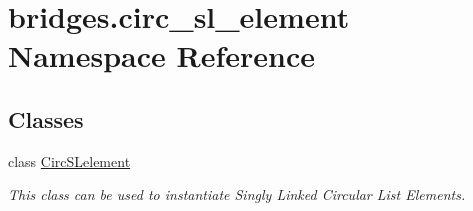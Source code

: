 \hypertarget{namespacebridges_1_1circ__sl__element}{}\section{bridges.\+circ\+\_\+sl\+\_\+element Namespace Reference}
\label{namespacebridges_1_1circ__sl__element}
\subsection*{Classes}
\begin{DoxyCompactItemize}
\item 
class \hyperlink{classbridges_1_1circ__sl__element_1_1_circ_s_lelement}{Circ\+S\+Lelement}
\begin{DoxyCompactList}\small\item\em This class can be used to instantiate Singly Linked Circular List Elements. \end{DoxyCompactList}\end{DoxyCompactItemize}
